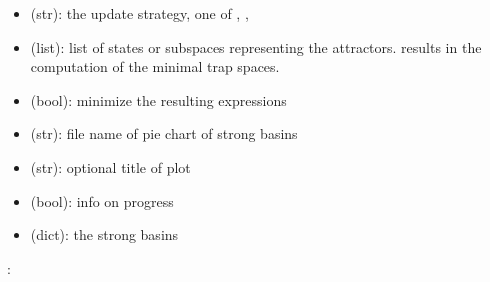 \documentclass[letterpaper,10pt,english]{sphinxmanual}
\begin{document}
\begin{fulllineitems}
\begin{description}
\begin{itemize}
\item {} 
 (str): the update strategy, one of , , 

\item {} 
 (list): list of states or subspaces representing the attractors.  results in the computation of the minimal trap spaces.

\item {} 
 (bool): minimize the resulting expressions

\item {} 
 (str): file name of pie chart of strong basins

\item {} 
 (str): optional title of plot

\item {} 
 (bool): info on progress

\end{itemize}

\item[{\sphinxstylestrong{returns}::}] \leavevmode\begin{itemize}
\item {} 
 (dict): the strong basins

\end{itemize}

\end{description}

:

\begin{sphinxVerbatim}[commandchars=\\\{\}]
  
 
\end{sphinxVerbatim}

\end{fulllineitems}
\end{document}
